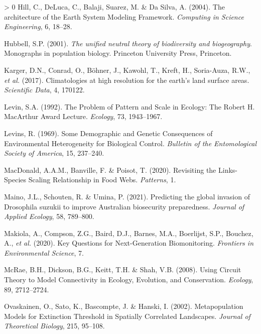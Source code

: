 \documentclass[10pt,oneside]{article}
\newlength{\cslhangindent}
\newenvironment{CSLReferences}[3] %
 {%
  \setlength{\parindent}{0pt}
  \ifodd #1 \everypar{\setlength{\hangindent}{\cslhangindent}}\ignorespaces\fi
  \ifnum #2 > 0
  \setlength{\parskip}{#2\baselineskip}
  \fi
 }%
 {}
\begin{document}
\begin{CSLReferences}{1}{0}
\leavevmode\hypertarget{ref-Hill2004ArcEar}{}%
Hill, C., DeLuca, C., Balaji, Suarez, M. \& Da Silva, A. (2004). The
architecture of the Earth System Modeling Framework. \emph{Computing in
Science Engineering}, 6, 18--28.

\leavevmode\hypertarget{ref-Hubbell2001UniNeu}{}%
Hubbell, S.P. (2001). \emph{The unified neutral theory of biodiversity
and biogeography}. Monographs in population biology. Princeton
University Press, Princeton.

\leavevmode\hypertarget{ref-Karger2017CliHig}{}%
Karger, D.N., Conrad, O., Böhner, J., Kawohl, T., Kreft, H., Soria-Auza,
R.W., \emph{et al.} (2017). Climatologies at high resolution for the
earth's land surface areas. \emph{Scientific Data}, 4, 170122.

\leavevmode\hypertarget{ref-Levin1992ProPat}{}%
Levin, S.A. (1992). The Problem of Pattern and Scale in Ecology: The
Robert H. MacArthur Award Lecture. \emph{Ecology}, 73, 1943--1967.

\leavevmode\hypertarget{ref-Levins1969DemGen}{}%
Levins, R. (1969). Some Demographic and Genetic Consequences of
Environmental Heterogeneity for Biological Control. \emph{Bulletin of
the Entomological Society of America}, 15, 237--240.

\leavevmode\hypertarget{ref-MacDonald2020RevLin}{}%
MacDonald, A.A.M., Banville, F. \& Poisot, T. (2020). Revisiting the
Links-Species Scaling Relationship in Food Webs. \emph{Patterns}, 1.

\leavevmode\hypertarget{ref-Maino2021PreGlo}{}%
Maino, J.L., Schouten, R. \& Umina, P. (2021). Predicting the global
invasion of Drosophila suzukii to improve Australian biosecurity
preparedness. \emph{Journal of Applied Ecology}, 58, 789--800.

\leavevmode\hypertarget{ref-Makiola2020KeyQue}{}%
Makiola, A., Compson, Z.G., Baird, D.J., Barnes, M.A., Boerlijst, S.P.,
Bouchez, A., \emph{et al.} (2020). Key Questions for Next-Generation
Biomonitoring. \emph{Frontiers in Environmental Science}, 7.

\leavevmode\hypertarget{ref-McRae2008UsiCir}{}%
McRae, B.H., Dickson, B.G., Keitt, T.H. \& Shah, V.B. (2008). Using
Circuit Theory to Model Connectivity in Ecology, Evolution, and
Conservation. \emph{Ecology}, 89, 2712--2724.

\leavevmode\hypertarget{ref-Ovaskainen2002MetMod}{}%
Ovaskainen, O., Sato, K., Bascompte, J. \& Hanski, I. (2002).
Metapopulation Models for Extinction Threshold in Spatially Correlated
Landscapes. \emph{Journal of Theoretical Biology}, 215, 95--108.


\end{CSLReferences}
\end{document}

